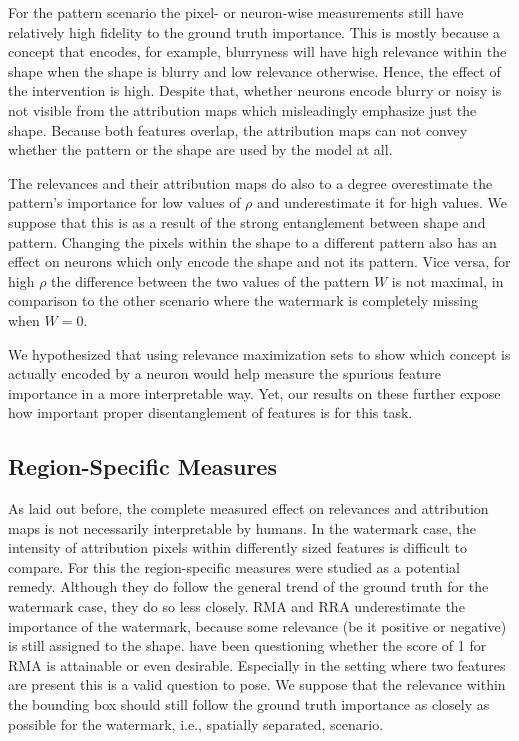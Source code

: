 For the pattern scenario the pixel- or neuron-wise measurements still have relatively high fidelity to the ground truth importance. 
This is mostly because a concept that encodes, for example, blurryness will have high relevance within the shape when the shape is blurry and low relevance otherwise. Hence, the effect of the intervention is high. Despite that, whether neurons encode blurry or noisy is not visible from the attribution maps which misleadingly emphasize just the shape. Because both features overlap, the attribution maps can not convey whether the pattern or the shape are used by the model at all.

The relevances and their attribution maps do also to a degree overestimate the pattern's importance for low values of $\rho$ and underestimate it for high values. We suppose that this is as a result of the strong entanglement between shape and pattern. Changing the pixels within the shape to a different pattern also has an effect on neurons which only encode the shape and not its pattern. Vice versa, for high $\rho$ the difference between the two values of the pattern $W$ is not maximal, in comparison to the other scenario where the watermark is completely missing when $W=0$. 

We hypothesized that using relevance maximization sets to show which concept is actually encoded by a neuron would help measure the spurious feature importance in a more interpretable way. Yet, our results on these further expose how important proper disentanglement of features is for this task. 

\subsection{Region-Specific Measures}
As laid out before, the complete measured effect on relevances and attribution maps is not necessarily interpretable by humans. In the watermark case, the intensity of attribution pixels within differently sized features is difficult to compare. For this the region-specific measures were studied as a potential remedy. 
Although they do follow the general trend of the ground truth for the watermark case, they do so less closely. 
RMA and RRA underestimate the importance of the watermark, because some relevance (be it positive or negative) is still assigned to the shape.
\citeauthor{Arras2022} have been questioning whether the score of 1 for RMA is attainable or even desirable. Especially in the setting where two features are present this is a valid question to pose. We suppose that the relevance within the bounding box should still follow the ground truth importance as closely as possible for the watermark, i.e., spatially separated, scenario. 

